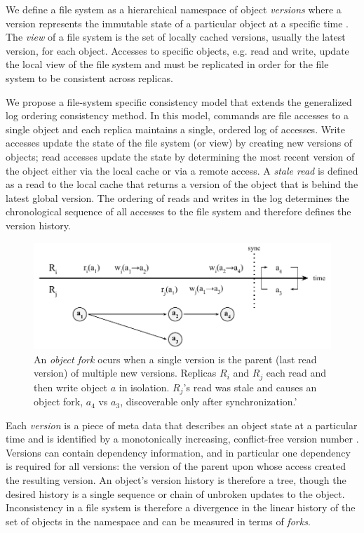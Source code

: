 \documentclass{article}
\begin{document}
We define a file system as a hierarchical namespace of object \textit{versions} where a version represents the immutable state of a particular object at a specific time \cite{helland_immutability_2015}. The \textit{view} of a file system is the set of locally cached versions, usually the latest version, for each object. Accesses to specific objects, e.g. read and write, update the local view of the file system and must be replicated in order for the file system to be consistent across replicas.

We propose a file-system specific consistency model that extends the generalized log ordering consistency method. In this model, commands are file accesses to a single object and each replica maintains a single, ordered log of accesses. Write accesses update the state of the file system (or view) by creating new versions of objects; read accesses update the state by determining the most recent version of the object either via the local cache or via a remote access. A \textit{stale read} is defined as a read to the local cache that returns a version of the object that is behind the latest global version. The ordering of reads and writes in the log determines the chronological sequence of all accesses to the file system and therefore defines the version history.

\begin{figure}
    \centering
        \includegraphics[width=.9\textwidth]{figures/forks}
        \caption[Forks branch sequentially ordered version numbers]{An \emph{object fork} ocurs when a single version is the parent (last read version) of multiple new versions. Replicas $R_i$ and $R_j$ each read and then write object $a$ in isolation. $R_j$'s read was stale and causes an object fork, $a_4$ vs $a_3$, discoverable only after synchronization.'}
        \label{fig:forks}
\end{figure}

Each \textit{version} is a piece of meta data that describes an object state at a particular time and is identified by a monotonically increasing, conflict-free version number \cite{parker_detection_1983}. Versions can contain dependency information, and in particular one dependency is required for all versions: the version of the parent upon whose access created the resulting version. An object's version history is therefore a tree, though the desired history is a single sequence or chain of unbroken updates to the object. Inconsistency in a file system is therefore a divergence in the linear history of the set of objects in the namespace and can be measured in terms of \textit{forks}.
\end{document}
